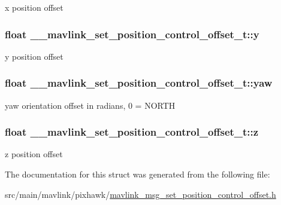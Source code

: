 x position offset 

\hypertarget{struct____mavlink__set__position__control__offset__t_a145d089a4a3ef318e6ef7081d3ac4e40}{
\subsubsection[{y}]{\setlength{\rightskip}{0pt plus 5cm}float \+\_\+\+\_\+mavlink\+\_\+set\+\_\+position\+\_\+control\+\_\+offset\+\_\+t\+::y}}\label{struct____mavlink__set__position__control__offset__t_a145d089a4a3ef318e6ef7081d3ac4e40}


y position offset 

\hypertarget{struct____mavlink__set__position__control__offset__t_ab45aaffab3bdc068c90707367c40643a}{
\subsubsection[{yaw}]{\setlength{\rightskip}{0pt plus 5cm}float \+\_\+\+\_\+mavlink\+\_\+set\+\_\+position\+\_\+control\+\_\+offset\+\_\+t\+::yaw}}\label{struct____mavlink__set__position__control__offset__t_ab45aaffab3bdc068c90707367c40643a}


yaw orientation offset in radians, 0 = N\+O\+R\+T\+H 

\hypertarget{struct____mavlink__set__position__control__offset__t_a626250e1e23229f2770cfcd681aaa043}{
\subsubsection[{z}]{\setlength{\rightskip}{0pt plus 5cm}float \+\_\+\+\_\+mavlink\+\_\+set\+\_\+position\+\_\+control\+\_\+offset\+\_\+t\+::z}}\label{struct____mavlink__set__position__control__offset__t_a626250e1e23229f2770cfcd681aaa043}


z position offset 



The documentation for this struct was generated from the following file\+:\begin{DoxyCompactItemize}
\item 
src/main/mavlink/pixhawk/\hyperlink{mavlink__msg__set__position__control__offset_8h}{mavlink\+\_\+msg\+\_\+set\+\_\+position\+\_\+control\+\_\+offset.\+h}\end{DoxyCompactItemize}
